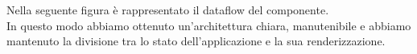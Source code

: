 \noindent
Nella seguente figura è rappresentato il dataflow del componente. \\
In questo modo abbiamo ottenuto un'architettura chiara, manutenibile e abbiamo mantenuto la divisione tra lo stato dell'applicazione e la sua renderizzazione.

\begin{minipage}{\linewidth}
\end{minipage}